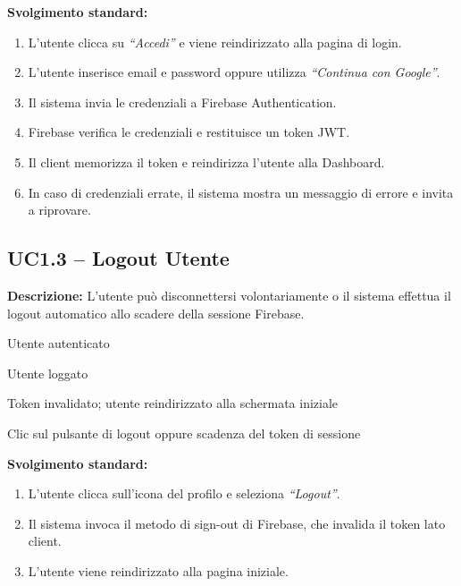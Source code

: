 \documentclass[12pt,a4paper,twoside]{report}
\newenvironment{ucbox}{%
  \begin{mdframed}[
    backgroundcolor=ucbg,
    linecolor=ucborder,
    linewidth=1pt,
    innerleftmargin=10pt,
    innerrightmargin=10pt,
    innertopmargin=8pt,
    innerbottommargin=8pt,
    roundcorner=4pt
  ]
}{%
  \end{mdframed}
}
\begin{document}
\textbf{Svolgimento standard:}
\begin{enumerate}
  \item L'utente clicca su \textit{``Accedi''} e viene reindirizzato alla pagina di login.
  \item L'utente inserisce email e password oppure utilizza \textit{``Continua con Google''}.
  \item Il sistema invia le credenziali a Firebase Authentication.
  \item Firebase verifica le credenziali e restituisce un token JWT.
  \item Il client memorizza il token e reindirizza l'utente alla Dashboard.
  \item In caso di credenziali errate, il sistema mostra un messaggio di errore e invita a riprovare.
\end{enumerate}

\newpage
\subsection{UC1.3 -- Logout Utente}

\begin{ucbox}
\textbf{Descrizione:} L'utente può disconnettersi volontariamente o il sistema effettua il logout automatico allo scadere della sessione Firebase.

\begin{description}[leftmargin=4cm, style=sameline]
  \item[Attori Coinvolti:] Utente autenticato
  \item[Precondizione:] Utente loggato
  \item[Postcondizione:] Token invalidato; utente reindirizzato alla schermata iniziale
  \item[Trigger:] Clic sul pulsante di logout oppure scadenza del token di sessione
\end{description}
\end{ucbox}

\textbf{Svolgimento standard:}
\begin{enumerate}
  \item L'utente clicca sull'icona del profilo e seleziona \textit{``Logout''}.
  \item Il sistema invoca il metodo di sign-out di Firebase, che invalida il token lato client.
  \item L'utente viene reindirizzato alla pagina iniziale.
\end{enumerate}
\end{document}
